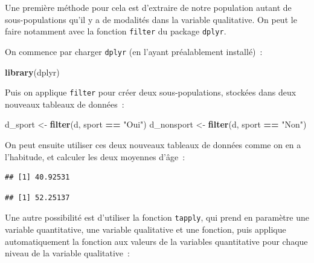 \documentclass[12pt,]{book}
\newenvironment{Shaded}{\begin{snugshade}}{\end{snugshade}}
\newcommand{\KeywordTok}[1]{\textcolor[rgb]{0.27,0.27,0.27}{\textbf{#1}}}
\newcommand{\NormalTok}[1]{#1}
\newcommand{\OperatorTok}[1]{\textcolor[rgb]{0.43,0.43,0.43}{\textbf{#1}}}
\newcommand{\StringTok}[1]{\textcolor[rgb]{0.5,0.5,0.5}{#1}}
\begin{document}
Une première méthode pour cela est d'extraire de notre population autant de sous-populations qu'il y a de modalités dans la variable qualitative. On peut le faire notamment avec la fonction \texttt{filter} du package \texttt{dplyr}.

On commence par charger \texttt{dplyr} (en l'ayant préalablement installé)~:

\begin{Shaded}
\begin{Highlighting}[]
\KeywordTok{library}\NormalTok{(dplyr)}
\end{Highlighting}
\end{Shaded}

Puis on applique \texttt{filter} pour créer deux sous-populations, stockées dans deux nouveaux tableaux de données~:

\begin{Shaded}
\begin{Highlighting}[]
\NormalTok{d_sport <-}\StringTok{ }\KeywordTok{filter}\NormalTok{(d, sport }\OperatorTok{==}\StringTok{ "Oui"}\NormalTok{)}
\NormalTok{d_nonsport <-}\StringTok{ }\KeywordTok{filter}\NormalTok{(d, sport }\OperatorTok{==}\StringTok{ "Non"}\NormalTok{)}
\end{Highlighting}
\end{Shaded}

On peut ensuite utiliser ces deux nouveaux tableaux de données comme on en a l'habitude, et calculer les deux moyennes d'âge~:

\begin{Shaded}
\end{Shaded}

\begin{verbatim}
## [1] 40.92531
\end{verbatim}

\begin{Shaded}
\end{Shaded}

\begin{verbatim}
## [1] 52.25137
\end{verbatim}

Une autre possibilité est d'utiliser la fonction \texttt{tapply}, qui prend en paramètre une variable quantitative, une variable qualitative et une fonction, puis applique automatiquement la fonction aux valeurs de la variables quantitative pour chaque niveau de la variable qualitative~:
\end{document}
